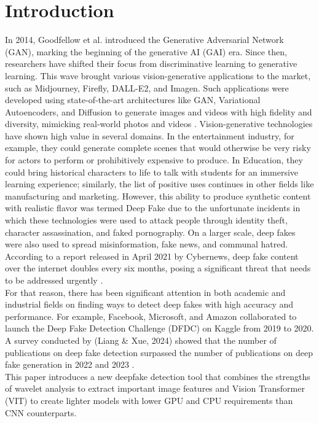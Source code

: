 \documentclass{svproc}
\begin{document}
\section{Introduction}
    In 2014, Goodfellow et al. introduced the Generative Adversarial Network (GAN), marking the beginning of the generative AI (GAI) era. Since then, researchers have shifted their focus from discriminative learning to generative learning. This wave brought various vision-generative applications to the market, such as Midjourney, Firefly, DALL-E2, and Imagen\cite {bengesi2024advancements}. Such applications were developed using state-of-the-art architectures like GAN, Variational Autoencoders, and Diffusion to generate images and videos with high fidelity and diversity, mimicking real-world photos and videos \cite{raut2024generative}. 
Vision-generative technologies have shown high value in several domains. In the entertainment industry, for example, they could generate complete scenes that would otherwise be very risky for actors to perform or prohibitively expensive to produce. In Education, they could bring historical characters to life to talk with students for an immersive learning experience; similarly, the list of positive uses continues in other fields like manufacturing and marketing. However, this ability to produce synthetic content with realistic flavor was termed Deep Fake due to the unfortunate incidents in which these technologies were used to attack people through identity theft, character assassination, and faked pornography. On a larger scale, deep fakes were also used to spread misinformation, fake news, and communal hatred.
According to a report released in April 2021 by Cybernews, deep fake content over the internet doubles every six months, posing a significant threat that needs to be addressed urgently \cite{patel2023deepfake}. 
\\For that reason, there has been significant attention in both academic and industrial fields on finding ways to detect deep fakes with high accuracy and performance. For example, Facebook, Microsoft, and Amazon collaborated to launch the Deep Fake Detection Challenge (DFDC) on Kaggle from 2019 to 2020. A survey conducted by (Liang \& Xue, 2024) showed that the number of publications on deep fake detection surpassed the number of publications on deep fake generation in 2022 and 2023 \cite {gong2024contemporary}.
\\This paper introduces a new deepfake detection tool that combines the strengths of wavelet analysis to extract important image features and Vision Transformer (VIT) to create lighter models with lower GPU and CPU requirements than CNN counterparts.
\end{document}

